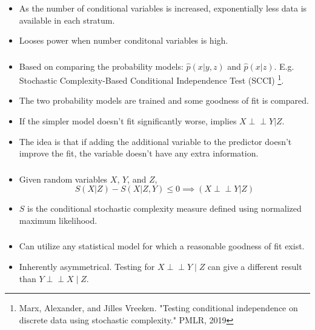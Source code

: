 \documentclass{beamer}
\def\ci{\perp\!\!\!\!\!\perp}
\begin{document}
\begin{frame}
	\frametitle{}
	\begin{itemize}
		\item As the number of conditional variables is increased, exponentially
			less data is available in each stratum.
		\item Looses power when number conditonal variables is high.
	\end{itemize}
\end{frame}

\begin{frame}
	\frametitle{}
	\begin{itemize}
		\setlength\itemsep{1em}
		\item Based on comparing the probability models: $\hat{p}(x |
			y, z) $ and $ \hat{p}(x | z) $. E.g. Stochastic
			Complexity-Based Conditional Independence Test (SCCI) \footnote{Marx, Alexander, and Jilles Vreeken. "Testing conditional independence on discrete data using stochastic complexity." PMLR, 2019}.
		\item The two probability models are trained and some goodness of fit is compared.
		\item If the simpler model doesn't fit significantly worse, implies $ X \ci Y | Z $.
		\item The idea is that if adding the additional variable to the predictor doesn't improve the fit, the variable
			doesn't have any extra information.
	\end{itemize}
	

\end{frame}

\begin{frame}
	\frametitle{}
	\begin{itemize}
		\item Given random variables $ X $, $Y $, and $Z$,
			$$ S(X | Z ) - S(X|Z, Y) \le 0 \implies (X \ci Y | Z) $$
		\item $ S $ is the conditional stochastic complexity measure defined using normalized maximum likelihood.
	\end{itemize}
\end{frame}

\begin{frame}
	\frametitle{}
	\begin{itemize}
		\item Can utilize any statistical model for which a reasonable goodness
			of fit exist.
		\item Inherently asymmetrical. Testing for $ X \ci Y \mid Z $ can give a different result than $ Y \ci X \mid Z $.
	\end{itemize}

\end{frame}
\end{document}
